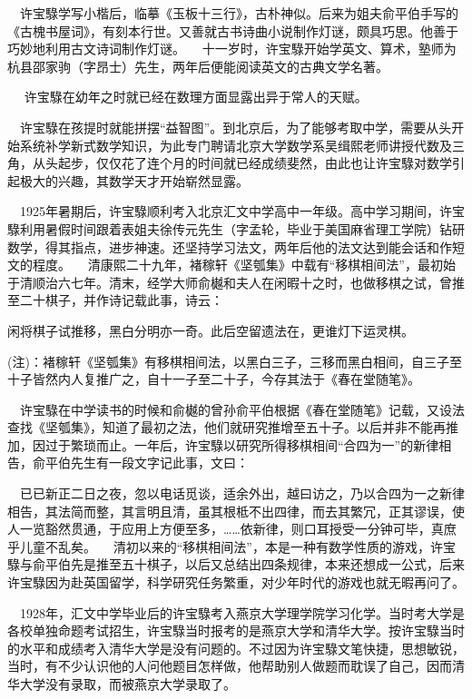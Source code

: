 $\quad$许宝騄学写小楷后，临摹《玉板十三行》，古朴神似。后来为姐夫俞平伯手写的《古槐书屋词》，有刻本行世。又善就古书诗曲小说制作灯谜，颇具巧思。他善于巧妙地利用古文诗词制作灯谜。
$\quad$十一岁时，许宝騄开始学英文、算术，塾师为杭县邵家驹（字昂士）先生，两年后便能阅读英文的古典文学名著。

$\quad$	许宝騄在幼年之时就已经在数理方面显露出异于常人的天赋。

$\quad$许宝騄在孩提时就能拼摆“益智图”。到北京后，为了能够考取中学，需要从头开始系统补学新式数学知识，为此专门聘请北京大学数学系吴缉熙老师讲授代数及三角，从头起步，仅仅花了连个月的时间就已经成绩斐然，由此也让许宝騄对数学引起极大的兴趣，其数学天才开始崭然显露。

$\quad$1925年暑期后，许宝騄顺利考入北京汇文中学高中一年级。高中学习期间，许宝騄利用暑假时间跟着表姐夫徐传元先生（字孟轮，毕业于美国麻省理工学院）钻研数学，得其指点，进步神速。还坚持学习法文，两年后他的法文达到能会话和作短文的程度。
$\quad$清康熙二十九年，褚稼轩《坚瓠集》中载有“移棋相间法”，最初始于清顺治六七年。清末，经学大师俞樾和夫人在闲暇十之时，也做移棋之试，曾推至二十棋子，并作诗记载此事，诗云：

闲将棋子试推移，黑白分明亦一奇。此后空留遗法在，更谁灯下运灵棋。

(注)：褚稼轩《坚瓠集》有移棋相间法，以黑白三子，三移而黑白相间，自三子至十子皆然内人复推广之，自十一子至二十子，今存其法于《春在堂随笔》。

$\quad$许宝騄在中学读书的时候和俞樾的曾孙俞平伯根据《春在堂随笔》记载，又设法查找《坚瓠集》，知道了最初之法，他们就研究推增至五十子。以后并非不能再推加，因过于繁琐而止。一年后，许宝騄以研究所得移棋相间“合四为一”的新律相告，俞平伯先生有一段文字记此事，文曰：

$\quad$已已新正二日之夜，忽以电话觅谈，适余外出，越曰访之，乃以合四为一之新律相告，其法简而整，其言明且清，虽其根柢不出四律，而去其繁冗，正其谬误，使人一览豁然贯通，于应用上方便至多，……依新律，则口耳授受一分钟可毕，真庶乎儿童不乱矣。
$\quad$清初以来的“移棋相间法”，本是一种有数学性质的游戏，许宝騄与俞平伯先是推至五十棋子，以后又总结出四条规律，本来还想成一公式，后来许宝騄因为赴英国留学，科学研究任务繁重，对少年时代的游戏也就无暇再问了。

$\quad$1928年，汇文中学毕业后的许宝騄考入燕京大学理学院学习化学。当时考大学是各校单独命题考试招生，许宝騄当时报考的是燕京大学和清华大学。按许宝騄当时的水平和成绩考入清华大学是没有问题的。不过因为许宝騄文笔快捷，思想敏锐，当时，有不少认识他的人问他题目怎样做，他帮助别人做题而耽误了自己，因而清华大学没有录取，而被燕京大学录取了。


